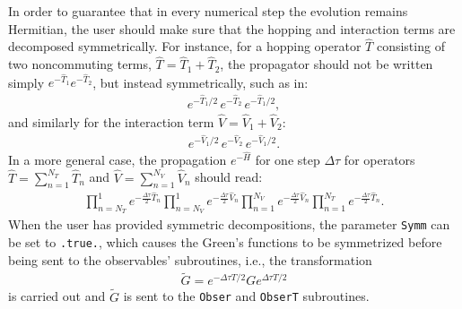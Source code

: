 In order to guarantee that in every numerical step the evolution remains Hermitian, the user should make sure that the hopping and interaction terms are decomposed symmetrically. For instance, for a hopping operator $\hat{T}$ consisting of two noncommuting terms, $\hat{T}=\hat{T}_1+\hat{T}_2$, the propagator should not be written simply $e^{-\hat{T}_1}e^{-\hat{T}_2} $, but instead symmetrically, such as in:
\begin{align}
e^{-\hat{T}_1/2}\, e^{-\hat{T}_2}\, e^{-\hat{T}_1/2},
\end{align}
and similarly for the interaction term $\hat{V}=\hat{V}_1+\hat{V}_2$:
\begin{align}
e^{-\hat{V}_1/2}\, e^{-\hat{V}_2}\, e^{-\hat{V}_1/2}.
\end{align} 
In a more general case, the propagation $e^{-\hat{H}}$ for one step $\Delta \tau$ for operators $\hat{T}= \sum_{n=1}^{N_T} \hat{T}_n$ and $\hat{V}= \sum_{n=1}^{N_V} \hat{V}_n$ should read:
\begin{align}
\prod_{n=N_T}^{1}e^{-\frac{\Delta \tau}{2} \hat{T}_n}
\prod_{n=N_V}^{1}e^{-\frac{\Delta \tau}{2} \hat{V}_n}  \prod_{n=1}^{N_V}e^{-\frac{\Delta \tau}{2} \hat{V}_n}
\prod_{n=1}^{N_T}e^{-\frac{\Delta \tau}{2} \hat{T}_n}.
\end{align}
When the user has provided symmetric decompositions, the parameter \texttt{Symm} can be set to \texttt{.true.}, which causes the Green's functions to be symmetrized before being sent to the observables' subroutines, i.e., the transformation
\begin{align}
\tilde{G} =  e^{-\Delta \tau T /2 } G e^{\Delta \tau T /2 }
\end{align}
is carried out and $ \tilde{G} $  is sent to the \texttt{Obser} and \texttt{ObserT} subroutines.
